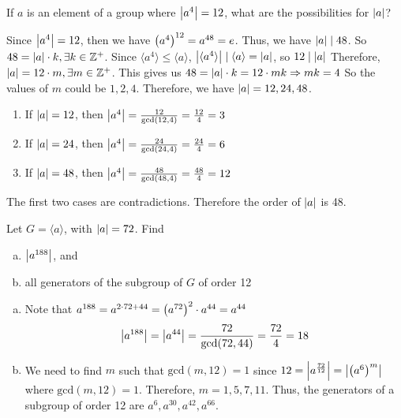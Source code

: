 \begin{exercise}
    If $a$ is an element of a group where $\qty|a^4| = 12$, what are the possibilities for $\qty|a|$?
\end{exercise}

\begin{solution}
    Since $\qty|a^4| = 12$, then we have $\qty(a^4)^{12} = a^{48} = e$. Thus, we have $\qty|a| \mid 48$. So $48 = \qty|a| \cdot k, \exists k \in \mathbb{Z}^+$. Since $\langle a^4 \rangle \leq \langle a \rangle$, $\qty|\langle a^4 \rangle| \mid \langle a \rangle = \qty|a|$, so $12 \mid \qty|a|$ Therefore, $\qty|a| = 12 \cdot m, \exists m \in \mathbb{Z}^+$. This gives us $48 = \qty|a| \cdot k = 12 \cdot mk \Rightarrow mk = 4$ So the values of $m$ could be $1, 2, 4$. Therefore, we have $\qty|a| = 12, 24, 48$.
    \begin{myspace}
        \begin{enumerate}[label=\textbf{Case \arabic*:}]
            \item If $\qty|a| = 12$, then $\qty|a^4| = \frac{12}{\text{gcd} \qty(12, 4)} = \frac{12}{4} = 3$
            \item If $\qty|a| = 24$, then $\qty|a^4| = \frac{24}{\text{gcd} \qty(24, 4)} = \frac{24}{4} = 6$
            \item If $\qty|a| = 48$, then $\qty|a^4| = \frac{48}{\text{gcd} \qty(48, 4)} = \frac{48}{4} = 12$
        \end{enumerate}
    \end{myspace}
    The first two cases are contradictions. Therefore the order of $\qty|a|$ is 48.
\end{solution}

\begin{exercise}
    Let $G = \langle a \rangle$, with $\qty|a| = 72$. Find
    \begin{enumerate}[(a)]
        \item $\qty|a^{188}|$, and
        \item all generators of the subgroup of $G$ of order 12
    \end{enumerate}
\end{exercise}

\begin{solution} \phantom{blank}
    \begin{enumerate}[(a)]
        \item  Note that $a^{188} = a^{2 \cdot 72 + 44} = \qty(a^{72})^2 \cdot a^{44} = a^{44}$
        \[ \qty|a^{188}| = \qty|a^{44}| = \frac{72}{\text{gcd}\qty(72, 44)} = \frac{72}{4} = 18 \]
        \item We need to find $m$ such that $\text{gcd}(m, 12) = 1$ since $12 = \qty|a^{\frac{72}{12}}| = \qty|\qty(a^6)^m|$ where $\text{gcd}(m, 12) = 1$. Therefore, $m = 1, 5, 7, 11$. Thus, the generators of a subgroup of order 12 are $a^6, a^{30}, a^{42}, a^{66}$.
    \end{enumerate}
\end{solution}

